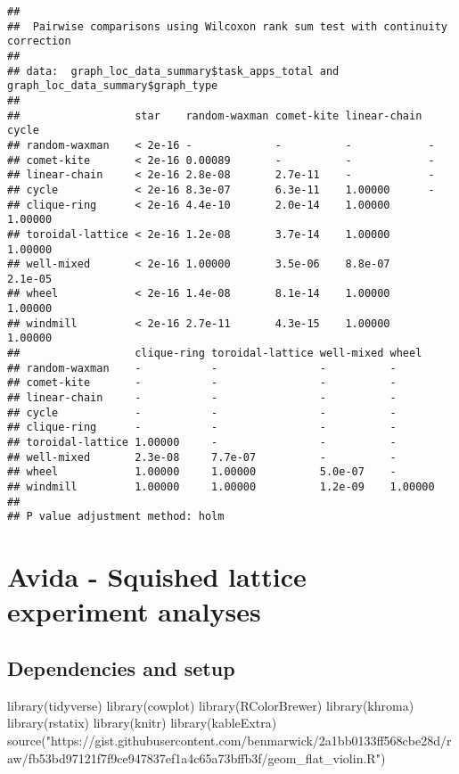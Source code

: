 \documentclass[
]{book}
\newenvironment{Shaded}{\begin{snugshade}}{\end{snugshade}}
\newcommand{\FunctionTok}[1]{\textcolor[rgb]{0.00,0.00,0.00}{#1}}
\newcommand{\NormalTok}[1]{#1}
\newcommand{\StringTok}[1]{\textcolor[rgb]{0.31,0.60,0.02}{#1}}
\begin{document}
\begin{verbatim}
## 
##  Pairwise comparisons using Wilcoxon rank sum test with continuity correction 
## 
## data:  graph_loc_data_summary$task_apps_total and graph_loc_data_summary$graph_type 
## 
##                  star    random-waxman comet-kite linear-chain cycle  
## random-waxman    < 2e-16 -             -          -            -      
## comet-kite       < 2e-16 0.00089       -          -            -      
## linear-chain     < 2e-16 2.8e-08       2.7e-11    -            -      
## cycle            < 2e-16 8.3e-07       6.3e-11    1.00000      -      
## clique-ring      < 2e-16 4.4e-10       2.0e-14    1.00000      1.00000
## toroidal-lattice < 2e-16 1.2e-08       3.7e-14    1.00000      1.00000
## well-mixed       < 2e-16 1.00000       3.5e-06    8.8e-07      2.1e-05
## wheel            < 2e-16 1.4e-08       8.1e-14    1.00000      1.00000
## windmill         < 2e-16 2.7e-11       4.3e-15    1.00000      1.00000
##                  clique-ring toroidal-lattice well-mixed wheel  
## random-waxman    -           -                -          -      
## comet-kite       -           -                -          -      
## linear-chain     -           -                -          -      
## cycle            -           -                -          -      
## clique-ring      -           -                -          -      
## toroidal-lattice 1.00000     -                -          -      
## well-mixed       2.3e-08     7.7e-07          -          -      
## wheel            1.00000     1.00000          5.0e-07    -      
## windmill         1.00000     1.00000          1.2e-09    1.00000
## 
## P value adjustment method: holm
\end{verbatim}

\hypertarget{avida---squished-lattice-experiment-analyses}{%
\chapter{Avida - Squished lattice experiment analyses}\label{avida---squished-lattice-experiment-analyses}}

\hypertarget{dependencies-and-setup-2}{%
\section{Dependencies and setup}\label{dependencies-and-setup-2}}

\begin{Shaded}
\begin{Highlighting}[]
\FunctionTok{library}\NormalTok{(tidyverse)}
\FunctionTok{library}\NormalTok{(cowplot)}
\FunctionTok{library}\NormalTok{(RColorBrewer)}
\FunctionTok{library}\NormalTok{(khroma)}
\FunctionTok{library}\NormalTok{(rstatix)}
\FunctionTok{library}\NormalTok{(knitr)}
\FunctionTok{library}\NormalTok{(kableExtra)}
\FunctionTok{source}\NormalTok{(}\StringTok{"https://gist.githubusercontent.com/benmarwick/2a1bb0133ff568cbe28d/raw/fb53bd97121f7f9ce947837ef1a4c65a73bffb3f/geom\_flat\_violin.R"}\NormalTok{)}
\end{Highlighting}
\end{Shaded}
\end{document}

